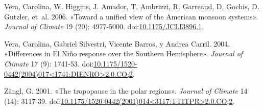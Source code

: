 \documentclass[spanish,a4paper]{book}
\begin{document}
\hypertarget{ref-Vera2006}{}
Vera, Carolina, W. Higgins, J. Amador, T. Ambrizzi, R. Garreaud, D.
Gochis, D. Gutzler, et~al. 2006. «Toward a unified view of the American
monsoon systems». \emph{Journal of Climate} 19 (20): 4977-5000.
doi:\href{https://doi.org/10.1175/JCLI3896.1}{10.1175/JCLI3896.1}.

\hypertarget{ref-Vera2004}{}
Vera, Carolina, Gabriel Silvestri, Vicente Barros, y Andrea Carril.
2004. «Differences in El Niño response over the Southern Hemisphere».
\emph{Journal of Climate} 17 (9): 1741-53.
doi:\href{https://doi.org/10.1175/1520-0442(2004)017\%3C1741:DIENRO\%3E2.0.CO;2}{10.1175/1520-0442(2004)017\textless{}1741:DIENRO\textgreater{}2.0.CO;2}.

\hypertarget{ref-Zangl2001}{}
Zängl, G. 2001. «The tropopause in the polar regions». \emph{Journal of
Climate} 14 (14): 3117-39.
doi:\href{https://doi.org/10.1175/1520-0442(2001)014\%3C3117:TTITPR\%3E2.0.CO;2}{10.1175/1520-0442(2001)014\textless{}3117:TTITPR\textgreater{}2.0.CO;2}.
\end{document}
